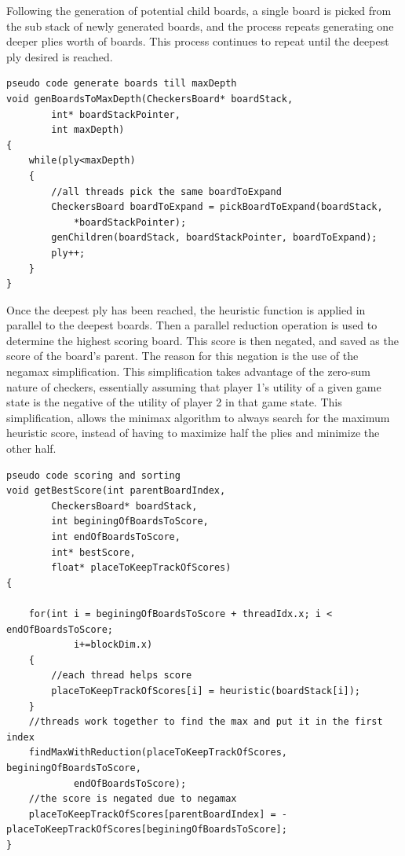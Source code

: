 \documentclass[11pt]{article}
\begin{document}
Following the generation of potential child boards, a single board is picked
from the sub stack of newly generated boards, and the process repeats generating
one deeper plies worth of boards. This process continues to repeat until the
deepest ply desired is reached.

\begin{lstlisting}
pseudo code generate boards till maxDepth
void genBoardsToMaxDepth(CheckersBoard* boardStack,
        int* boardStackPointer,
        int maxDepth)
{
    while(ply<maxDepth)
    {
        //all threads pick the same boardToExpand
        CheckersBoard boardToExpand = pickBoardToExpand(boardStack,
            *boardStackPointer); 
        genChildren(boardStack, boardStackPointer, boardToExpand);
        ply++;
    }
}
\end{lstlisting}

Once the deepest ply has been reached, the heuristic function is applied in
parallel to the deepest boards. Then a parallel reduction operation is used to
determine the highest scoring board. This score is then negated, and saved as
the score of the board's parent. The reason for this negation is the use of the
negamax simplification. This simplification takes advantage of the zero-sum
nature of checkers, essentially assuming that player 1's utility of a given game
state is the negative of the utility of player 2 in that game state. This
simplification, allows the minimax algorithm to always search for the maximum
heuristic score, instead of having to maximize half the plies and minimize the
other half.

\begin{lstlisting}
pseudo code scoring and sorting
void getBestScore(int parentBoardIndex,
        CheckersBoard* boardStack,
        int beginingOfBoardsToScore,
        int endOfBoardsToScore,
        int* bestScore,
        float* placeToKeepTrackOfScores)
{
    
    for(int i = beginingOfBoardsToScore + threadIdx.x; i < endOfBoardsToScore;
            i+=blockDim.x)
    {
        //each thread helps score
        placeToKeepTrackOfScores[i] = heuristic(boardStack[i]);
    }
    //threads work together to find the max and put it in the first index
    findMaxWithReduction(placeToKeepTrackOfScores, beginingOfBoardsToScore,
            endOfBoardsToScore);
    //the score is negated due to negamax
    placeToKeepTrackOfScores[parentBoardIndex] = - placeToKeepTrackOfScores[beginingOfBoardsToScore];
}
\end{lstlisting}
\end{document}
